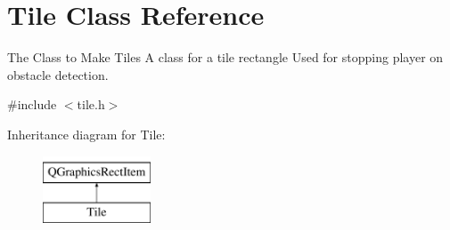 \hypertarget{classTile}{\section{Tile Class Reference}
\label{classTile}
}


The Class to Make Tiles A class for a tile rectangle Used for stopping player on obstacle detection.  




{\ttfamily \#include $<$tile.\-h$>$}

Inheritance diagram for Tile\-:\begin{figure}[H]
\begin{center}
\leavevmode
\includegraphics[height=2.000000cm]{classTile}
\end{center}
\end{figure}
